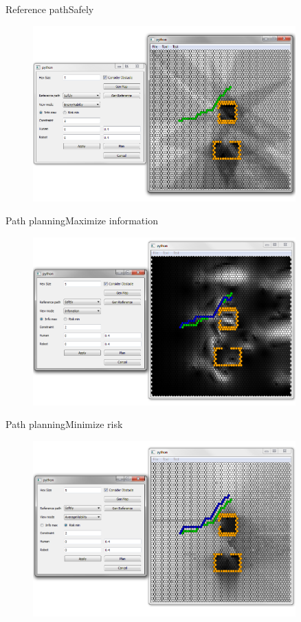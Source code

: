 \begin{frame}{Reference path}{Safely}

\begin{figure}
\centering
\includegraphics[width = 0.9\textwidth]{./screenshot/safely_reference_path.png}
\end{figure}

\end{frame}

\begin{frame}{Path planning}{Maximize information}

\begin{figure}
\centering
\includegraphics[width = 0.9\textwidth]{./screenshot/info_max_path.png}
\end{figure}

\end{frame}

\begin{frame}{Path planning}{Minimize risk}

\begin{figure}
\centering
\includegraphics[width = 0.9\textwidth]{./screenshot/risk_min_path.png}
\end{figure}

\end{frame}